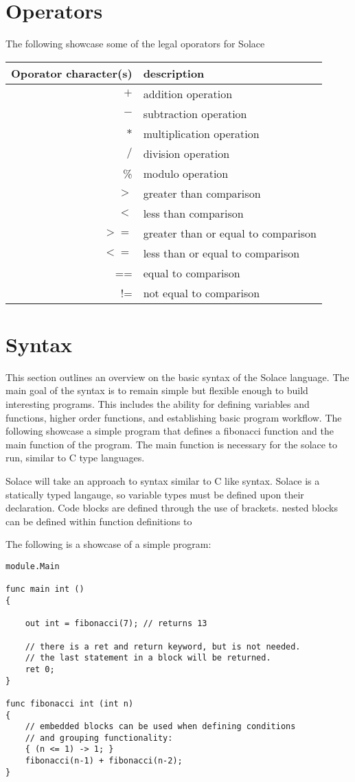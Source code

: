 \documentclass{article}
\begin{document}
\section{Operators}
The following showcase some of the legal oporators for Solace

\begin{tabular}{r|l}
Oporator character(s) & description \\
\hline
\hline
$+$ & addition operation \\
$-$ & subtraction operation \\
$*$ & multiplication operation \\
$/$ & division operation \\
\% & modulo operation \\
$>$ & greater than comparison \\
$<$ & less than comparison \\
$>=$ & greater than or equal to comparison \\
$<=$ & less than or equal to comparison \\
== & equal to comparison \\
!= & not equal to comparison \\
\hline
\end{tabular}


\section{Syntax}
This section outlines an overview on the basic syntax of the Solace language.
The main goal of the syntax is to remain simple but flexible enough to build
interesting programs. This includes the ability for defining variables and functions,
higher order functions, and establishing basic program workflow.
The following showcase a simple program that defines a fibonacci function and 
the main function of the program. The main function is necessary for the solace to
run, similar to C type languages.

Solace will take an approach to syntax similar to C like syntax. Solace is a statically typed
langauge, so variable types must be defined upon their declaration. Code blocks are defined
through the use of brackets. nested blocks can be defined within function definitions to


The following is a showcase of a simple program:
\begin{lstlisting}
module.Main

func main int ()
{
	
	out int = fibonacci(7); // returns 13
	
	// there is a ret and return keyword, but is not needed.
	// the last statement in a block will be returned.
	ret 0;
}

func fibonacci int (int n)
{
	// embedded blocks can be used when defining conditions
	// and grouping functionality:
	{ (n <= 1) -> 1; }
	fibonacci(n-1) + fibonacci(n-2);
}
\end{lstlisting}
\end{document}
